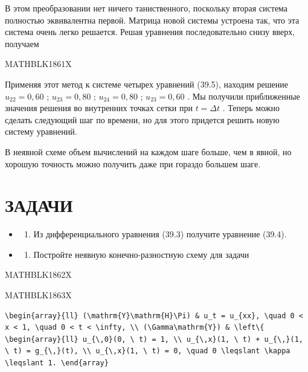 \documentclass[
]{article}
\providecommand{\tightlist}{%
  \setlength{\itemsep}{0pt}\setlength{\parskip}{0pt}}
\begin{document}
В этом преобразовании нет ничего таниственного, поскольку вторая система
полностью эквивалентна первой. Матрица новой системы устроена так, что
эта система очень легко решается. Решая уравнения последовательно снизу
вверх, получаем

MATHBLK1861X

Применяя этот метод к системе четырех уравнений (39.5), находим решение
\(u_{22}=0,60\) ; \(u_{23}=0,80\) ; \(u_{24}=0,80\) ; \(u_{23}=0,60\) .
Мы получили приближенные значения решения во внутренних точках сетки при
\(t=\Delta t\) . Теперь можно сделать следующий шаг по времени, но для
этого придется решить новую систему уравнений.

В неявной схеме объем вычислений на каждом шаге больше, чем в явной, но
хорошую точность можно получить даже при гораздо большем шаге.

\section{ЗАДАЧИ}\label{ux437ux430ux434ux430ux447ux438-17}

\begin{itemize}
\tightlist
\item
  \begin{enumerate}
  \def\labelenumi{\arabic{enumi}.}
  \tightlist
  \item
    Из дифференциального уравнения (39.3) получите уравнение (39.4).
  \end{enumerate}
\item
  \begin{enumerate}
  \def\labelenumi{\arabic{enumi}.}
  \setcounter{enumi}{1}
  \tightlist
  \item
    Постройте неявную конечно-разностную схему для задачи
  \end{enumerate}
\end{itemize}

MATHBLK1862X

MATHBLK1863X

\begin{verbatim}
\begin{array}{ll} (\mathrm{Y}\mathrm{H}\Pi) & u_t = u_{xx}, \quad 0 < x < 1, \quad 0 < t < \infty, \\ (\Gamma\mathrm{Y}) & \left\{ \begin{array}{ll} u_{\,0}(0, \ t) = 1, \\ u_{\,x}(1, \ t) + u_{\,}(1, \ t) = g_{\,}(t), \\ u_{\,x}(1, \ t) = 0, \quad 0 \leqslant \kappa \leqslant 1. \end{array}
\end{verbatim}
\end{document}
